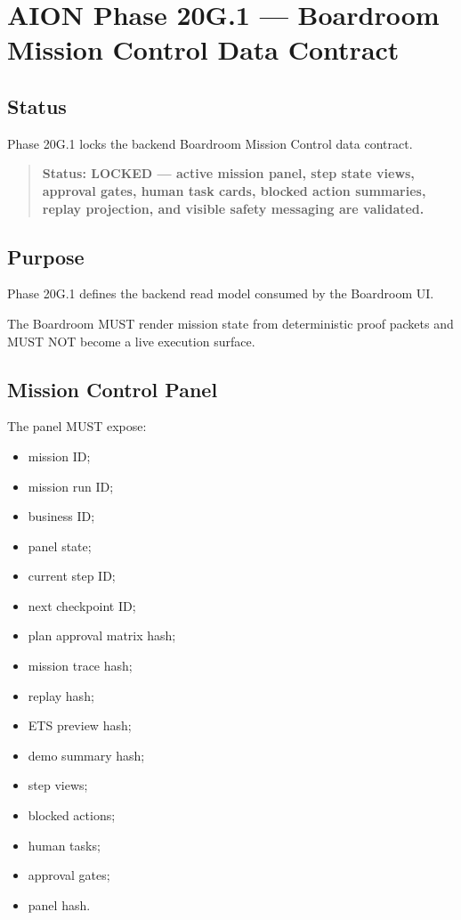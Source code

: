 \section{AION Phase 20G.1 --- Boardroom Mission Control Data Contract}
\label{sec:aion-phase20g1-boardroom-mission-control-contract}

\subsection{Status}

Phase 20G.1 locks the backend Boardroom Mission Control data contract.

\begin{quote}
\textbf{Status: LOCKED --- active mission panel, step state views, approval gates, human task cards, blocked action summaries, replay projection, and visible safety messaging are validated.}
\end{quote}

\subsection{Purpose}

Phase 20G.1 defines the backend read model consumed by the Boardroom UI.

The Boardroom MUST render mission state from deterministic proof packets and MUST NOT become a live execution surface.

\subsection{Mission Control Panel}

The panel MUST expose:

\begin{itemize}
  \item mission ID;
  \item mission run ID;
  \item business ID;
  \item panel state;
  \item current step ID;
  \item next checkpoint ID;
  \item plan approval matrix hash;
  \item mission trace hash;
  \item replay hash;
  \item ETS preview hash;
  \item demo summary hash;
  \item step views;
  \item blocked actions;
  \item human tasks;
  \item approval gates;
  \item panel hash.
\end{itemize}


